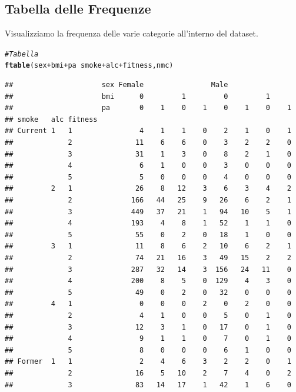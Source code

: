 \documentclass{article}\usepackage[]{graphicx}\usepackage[]{xcolor}
\makeatletter
\newcommand{\hlcom}[1]{\textcolor[rgb]{0.678,0.584,0.686}{\textit{#1}}}%
\newcommand{\hlopt}[1]{\textcolor[rgb]{0,0,0}{#1}}%
\newcommand{\hlstd}[1]{\textcolor[rgb]{0.345,0.345,0.345}{#1}}%
\newcommand{\hlkwd}[1]{\textcolor[rgb]{0.737,0.353,0.396}{\textbf{#1}}}%
\newenvironment{kframe}{%
 \def\at@end@of@kframe{}%
 \ifinner\ifhmode%
  \def\at@end@of@kframe{\end{minipage}}%
  \begin{minipage}{\columnwidth}%
 \fi\fi%
 \def\FrameCommand##1{\hskip\@totalleftmargin \hskip-\fboxsep
 \colorbox{shadecolor}{##1}\hskip-\fboxsep
     \hskip-\linewidth \hskip-\@totalleftmargin \hskip\columnwidth}%
 \MakeFramed {\advance\hsize-\width
   \@totalleftmargin\z@ \linewidth\hsize
   \@setminipage}}%
 {\par\unskip\endMakeFramed%
 \at@end@of@kframe}
\newenvironment{knitrout}{}{} %
\makeatother
\begin{document}
  \subsection{Tabella delle Frequenze}
    Visualizziamo la frequenza delle varie categorie all'interno del dataset.
\begin{knitrout}
\color{fgcolor}\begin{kframe}
\begin{alltt}
\hlcom{#Tabella}
\hlkwd{ftable}\hlstd{(sex}\hlopt{+}\hlstd{bmi}\hlopt{+}\hlstd{pa} \hlopt{~} \hlstd{smoke}\hlopt{+}\hlstd{alc}\hlopt{+}\hlstd{fitness, nmc)}
\end{alltt}
\begin{verbatim}
##                     sex Female                Male               
##                     bmi      0         1         0         1     
##                     pa       0    1    0    1    0    1    0    1
## smoke   alc fitness                                              
## Current 1   1                4    1    1    0    2    1    0    1
##             2               11    6    6    0    3    2    2    0
##             3               31    1    3    0    8    2    1    0
##             4                6    1    0    0    3    0    0    0
##             5                5    0    0    0    4    0    0    0
##         2   1               26    8   12    3    6    3    4    2
##             2              166   44   25    9   26    6    2    1
##             3              449   37   21    1   94   10    5    1
##             4              193    4    8    1   52    1    1    0
##             5               55    0    2    0   18    1    0    0
##         3   1               11    8    6    2   10    6    2    1
##             2               74   21   16    3   49   15    2    2
##             3              287   32   14    3  156   24   11    0
##             4              200    8    5    0  129    4    3    0
##             5               49    0    2    0   32    0    0    0
##         4   1                0    0    0    2    0    2    0    0
##             2                4    1    0    0    5    0    1    0
##             3               12    3    1    0   17    0    1    0
##             4                9    1    1    0    7    0    1    0
##             5                8    0    0    0    6    1    0    0
## Former  1   1                2    4    6    3    2    2    0    1
##             2               16    5   10    2    7    4    0    2
##             3               83   14   17    1   42    1    6    0

\end{verbatim}
\end{kframe}
\end{knitrout}
\end{document}
